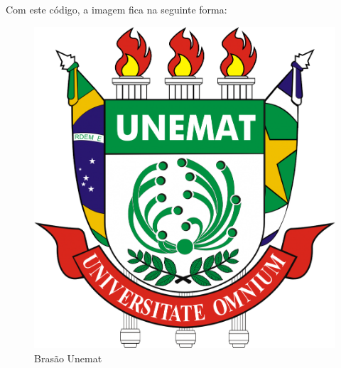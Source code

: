 Com este código, a imagem fica na seguinte forma:

\begin{figure}[htb]			
	\caption{Brasão Unemat \label{fig_Cap2_brasaoUnemat}}
	\begin{center}
		\includegraphics[scale=0.1]{./Imagens/Brasao_Unemat.png}
	\end{center}
\end{figure}